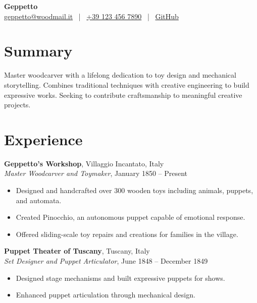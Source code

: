 \documentclass[10pt]{article}
\begin{document}
\begin{center}
    {\Large\bfseries{Geppetto}}\\[0.2em]
    {\normalsize
        \href{mailto:geppetto@woodmail.it}{geppetto@woodmail.it} ~|~
        \href{tel:+39 123 456 7890}{+39 123 456 7890} ~|~
        \href{https://github.com/geppetto-works}{GitHub}
    }
\end{center}

\vspace{0.5em}


\section*{Summary}

Master woodcarver with a lifelong dedication to toy design and mechanical storytelling.
Combines traditional techniques with creative engineering to build expressive works.
Seeking to contribute craftsmanship to meaningful creative projects.




\section*{Experience}

\textbf{Geppetto's Workshop}, \hfill Villaggio Incantato, Italy \\
\textit{Master Woodcarver and Toymaker}, \hfill January 1850 -- Present
\begin{itemize}[leftmargin=*, noitemsep, topsep=0.1em]

    \item Designed and handcrafted over 300 wooden toys including animals, puppets, and automata.

    \item Created Pinocchio, an autonomous puppet capable of emotional response.

    \item Offered sliding-scale toy repairs and creations for families in the village.

\end{itemize}
\vspace{0.3em}

\textbf{Puppet Theater of Tuscany}, \hfill Tuscany, Italy \\
\textit{Set Designer and Puppet Articulator}, \hfill June 1848 -- December 1849
\begin{itemize}[leftmargin=*, noitemsep, topsep=0.1em]

    \item Designed stage mechanisms and built expressive puppets for shows.

    \item Enhanced puppet articulation through mechanical design.

\end{itemize}
\vspace{0.3em}
\end{document}
